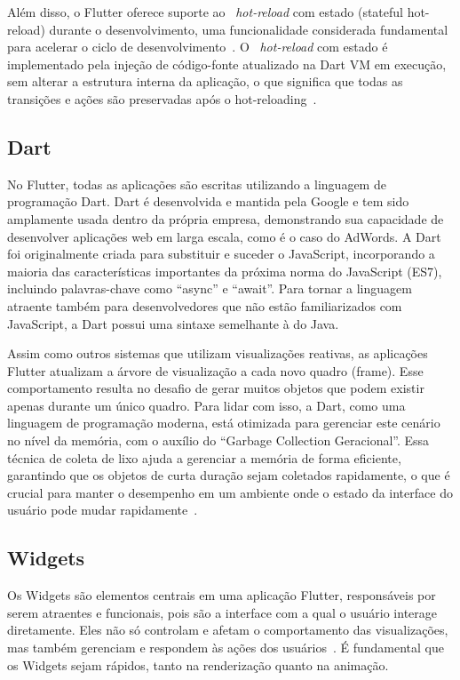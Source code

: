 Além disso, o Flutter oferece suporte ao ~\textit{hot-reload} com estado (stateful hot-reload) durante o desenvolvimento, uma funcionalidade considerada fundamental para acelerar o ciclo de desenvolvimento~\cite{wu2018react}.
O ~\textit{hot-reload} com estado é implementado pela injeção de código-fonte atualizado na Dart VM em execução, sem alterar a estrutura interna da aplicação, o que significa que todas as transições e ações são preservadas após o hot-reloading~\cite{flutter}.

\subsection{Dart}\label{subsec: dart}
No Flutter, todas as aplicações são escritas utilizando a linguagem de programação Dart.
Dart é desenvolvida e mantida pela Google e tem sido amplamente usada dentro da própria empresa, demonstrando sua capacidade de desenvolver aplicações web em larga escala, como é o caso do AdWords.
A Dart foi originalmente criada para substituir e suceder o JavaScript, incorporando a maioria das características importantes da próxima norma do JavaScript (ES7), incluindo palavras-chave como “async” e “await”.
Para tornar a linguagem atraente também para desenvolvedores que não estão familiarizados com JavaScript, a Dart possui uma sintaxe semelhante à do Java.

Assim como outros sistemas que utilizam visualizações reativas, as aplicações Flutter atualizam a árvore de visualização a cada novo quadro (frame).
Esse comportamento resulta no desafio de gerar muitos objetos que podem existir apenas durante um único quadro.
Para lidar com isso, a Dart, como uma linguagem de programação moderna, está otimizada para gerenciar este cenário no nível da memória, com o auxílio do “Garbage Collection Geracional”.
Essa técnica de coleta de lixo ajuda a gerenciar a memória de forma eficiente, garantindo que os objetos de curta duração sejam coletados rapidamente, o que é crucial para manter o desempenho em um ambiente onde o estado da interface do usuário pode mudar rapidamente~\cite{flutter}.

\subsection{Widgets}\label{subsec: widgets}
Os Widgets são elementos centrais em uma aplicação Flutter, responsáveis por serem atraentes e funcionais, pois são a interface com a qual o usuário interage diretamente.
Eles não só controlam e afetam o comportamento das visualizações, mas também gerenciam e respondem às ações dos usuários~\cite{wu2018react}.
É fundamental que os Widgets sejam rápidos, tanto na renderização quanto na animação.

